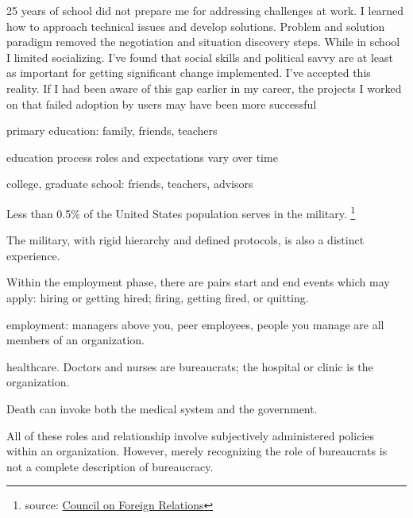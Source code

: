 
25 years of school did not prepare me for addressing challenges at work. I learned how to approach technical issues and develop solutions. Problem and solution paradigm removed the negotiation and situation discovery steps. While in school I limited socializing. I've found that social skills and political savvy are at least as important for getting significant change implemented.  I've accepted this reality. If I had been aware of this gap earlier in my career, the projects I worked on that failed adoption by users may have been more successful



primary education: family, friends, teachers


 education process roles and expectations vary over time

college, graduate school: friends, teachers, advisors



Less than 0.5\% of the United States population serves in the military. \footnote{source: \href{https://www.cfr.org/backgrounder/demographics-us-military}{Council on Foreign Relations}}

The military, with rigid hierarchy and defined protocols, is also a distinct experience. 



Within the employment phase, there are pairs start and end events which may apply: hiring or getting hired; firing, getting fired, or quitting. 

employment: managers above you, peer employees, people you manage are all members of an organization. 

healthcare. Doctors and nurses are bureaucrats; the hospital or clinic is the organization. 


Death can invoke both the medical system and the government. 





All of these roles and relationship involve subjectively administered policies within an organization. However, merely recognizing the role of bureaucrats is not a complete description of bureaucracy. 



